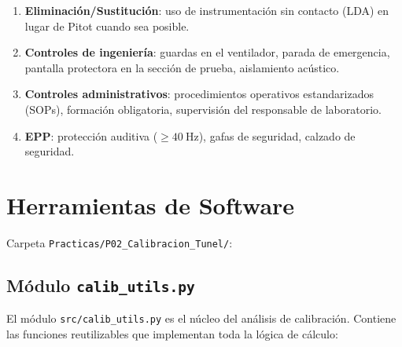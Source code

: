 \documentclass[12pt,a4paper]{article}
\begin{document}
\begin{enumerate}
	\item \textbf{Eliminación/Sustitución}: uso de instrumentación sin contacto
	      (LDA) en lugar de Pitot cuando sea posible.
	\item \textbf{Controles de ingeniería}: guardas en el ventilador, parada de
	      emergencia, pantalla protectora en la sección de prueba, aislamiento
	      acústico.
	\item \textbf{Controles administrativos}: procedimientos operativos
	      estandarizados (SOPs), formación obligatoria, supervisión del
	      responsable de laboratorio.
	\item \textbf{EPP}: protección auditiva ($\geq\SI{40}{\Hz}$), gafas de
	      seguridad, calzado de seguridad.
\end{enumerate}

\section{Herramientas de Software}
\label{sec:software}

Carpeta \texttt{Practicas/P02\_Calibracion\_Tunel/}:

\subsection{Módulo \texttt{calib\_utils.py}}

El módulo \texttt{src/calib\_utils.py} es el núcleo del análisis de
calibración.  Contiene las funciones reutilizables que implementan toda la
lógica de cálculo:
\end{document}
